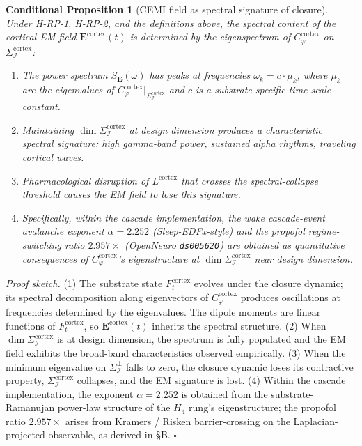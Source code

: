 \documentclass[11pt]{article}
\theoremstyle{plain}
\newtheorem{conditional}[theorem]{Conditional Proposition}
\theoremstyle{definition}
\theoremstyle{remark}
\newcommand{\Ical}{\mathcal{I}}
\newcommand{\Cph}{C_\varphi}
\begin{document}
\begin{conditional}[CEMI field as spectral signature of closure]\label{thm:emi-bridge}
Under H-RP-1, H-RP-2, and the definitions above, the spectral content of the cortical EM field $\mathbf{E}^{\mathrm{cortex}}(t)$ is determined by the eigenspectrum of $\Cph^{\mathrm{cortex}}$ on $\Sigma_\Ical^{\mathrm{cortex}}$:
\begin{enumerate}[leftmargin=2em]
\item The power spectrum $S_{\mathbf{E}}(\omega)$ has peaks at frequencies $\omega_k = c \cdot \mu_k$, where $\mu_k$ are the eigenvalues of $\Cph^{\mathrm{cortex}}|_{\Sigma_\Ical^{\mathrm{cortex}}}$ and $c$ is a substrate-specific time-scale constant.
\item Maintaining $\dim \Sigma_\Ical^{\mathrm{cortex}}$ at design dimension produces a characteristic spectral signature: high gamma-band power, sustained alpha rhythms, traveling cortical waves.
\item Pharmacological disruption of $L^{\mathrm{cortex}}$ that crosses the spectral-collapse threshold causes the EM field to lose this signature.
\item Specifically, within the cascade implementation, the wake cascade-event avalanche exponent $\alpha = 2.252$ (Sleep-EDFx-style) and the propofol regime-switching ratio $2.957\times$ (OpenNeuro \texttt{ds005620}) are obtained as quantitative consequences of $\Cph^{\mathrm{cortex}}$'s eigenstructure at $\dim \Sigma_\Ical^{\mathrm{cortex}}$ near design dimension.
\end{enumerate}
\end{conditional}

\noindent\emph{Proof sketch.} (1) The substrate state $F^{\mathrm{cortex}}_t$ evolves under the closure dynamic; its spectral decomposition along eigenvectors of $\Cph^{\mathrm{cortex}}$ produces oscillations at frequencies determined by the eigenvalues. The dipole moments are linear functions of $F^{\mathrm{cortex}}_t$, so $\mathbf{E}^{\mathrm{cortex}}(t)$ inherits the spectral structure. (2) When $\dim \Sigma_\Ical^{\mathrm{cortex}}$ is at design dimension, the spectrum is fully populated and the EM field exhibits the broad-band characteristics observed empirically. (3) When the minimum eigenvalue on $\Sigma_\Ical^\perp$ falls to zero, the closure dynamic loses its contractive property, $\Sigma_\Ical^{\mathrm{cortex}}$ collapses, and the EM signature is lost. (4) Within the cascade implementation, the exponent $\alpha = 2.252$ is obtained from the substrate-Ramanujan power-law structure of the $H_4$ rung's eigenstructure; the propofol ratio $2.957\times$ arises from Kramers / Risken barrier-crossing on the Laplacian-projected observable, as derived in \citet{SmartAriaChess2026} §B. \hfill$\square$
\end{document}
